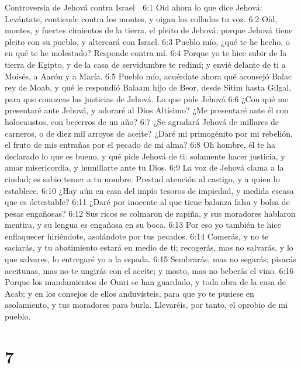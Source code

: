 Controversia de Jehová contra Israel  

6:1 Oíd ahora lo que dice Jehová: Levántate, contiende contra los montes, y oigan los collados tu voz.  
6:2 Oíd, montes, y fuertes cimientos de la tierra, el pleito de Jehová; porque Jehová tiene pleito con su pueblo, y altercará con Israel.  
6:3 Pueblo mío, ¿qué te he hecho, o en qué te he molestado? Responde contra mí.  
6:4 Porque yo te hice subir de la tierra de Egipto, y de la casa de servidumbre te redimí; y envié delante de ti a Moisés, a Aarón y a María. 
6:5 Pueblo mío, acuérdate ahora qué aconsejó Balac rey de Moab, y qué le respondió Balaam hijo de Beor, desde Sitim hasta Gilgal, para que conozcas las justicias de Jehová.  
Lo que pide Jehová  
6:6 ¿Con qué me presentaré ante Jehová, y adoraré al Dios Altísimo? ¿Me presentaré ante él con holocaustos, con becerros de un año?  
6:7 ¿Se agradará Jehová de millares de carneros, o de diez mil arroyos de aceite? ¿Daré mi primogénito por mi rebelión, el fruto de mis entrañas por el pecado de mi alma?  
6:8 Oh hombre, él te ha declarado lo que es bueno, y qué pide Jehová de ti: solamente hacer justicia, y amar misericordia, y humillarte ante tu Dios.  
6:9 La voz de Jehová clama a la ciudad; es sabio temer a tu nombre. Prestad atención al castigo, y a quien lo establece.  
6:10 ¿Hay aún en casa del impío tesoros de impiedad, y medida escasa que es detestable?  
6:11 ¿Daré por inocente al que tiene balanza falsa y bolsa de pesas engañosas?  
6:12 Sus ricos se colmaron de rapiña, y sus moradores hablaron mentira, y su lengua es engañosa en su boca.  
6:13 Por eso yo también te hice enflaquecer hiriéndote, asolándote por tus pecados.  
6:14 Comerás, y no te saciarás, y tu abatimiento estará en medio de ti; recogerás, mas no salvarás, y lo que salvares, lo entregaré yo a la espada.  
6:15 Sembrarás, mas no segarás; pisarás aceitunas, mas no te ungirás con el aceite; y mosto, mas no beberás el vino.  
6:16 Porque los mandamientos de Omri se han guardado, y toda obra de la casa de Acab; y en los consejos de ellos anduvisteis, para que yo te pusiese en asolamiento, y tus moradores para burla. Llevaréis, por tanto, el oprobio de mi pueblo.  

\chapter{7}

